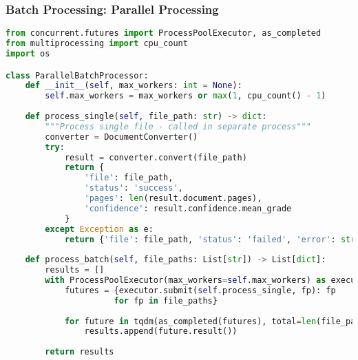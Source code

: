 \begin{frame}[fragile]\frametitle{Batch Processing: Parallel Processing}

\begin{lstlisting}[language=Python, basicstyle=\tiny]
from concurrent.futures import ProcessPoolExecutor, as_completed
from multiprocessing import cpu_count
import os

class ParallelBatchProcessor:
    def __init__(self, max_workers: int = None):
        self.max_workers = max_workers or max(1, cpu_count() - 1)
        
    def process_single(self, file_path: str) -> dict:
        """Process single file - called in separate process"""
        converter = DocumentConverter()
        try:
            result = converter.convert(file_path)
            return {
                'file': file_path,
                'status': 'success',
                'pages': len(result.document.pages),
                'confidence': result.confidence.mean_grade
            }
        except Exception as e:
            return {'file': file_path, 'status': 'failed', 'error': str(e)}
    
    def process_batch(self, file_paths: List[str]) -> List[dict]:
        results = []
        with ProcessPoolExecutor(max_workers=self.max_workers) as executor:
            futures = {executor.submit(self.process_single, fp): fp 
                      for fp in file_paths}
            
            for future in tqdm(as_completed(futures), total=len(file_paths)):
                results.append(future.result())
        
        return results
\end{lstlisting}
\end{frame}

